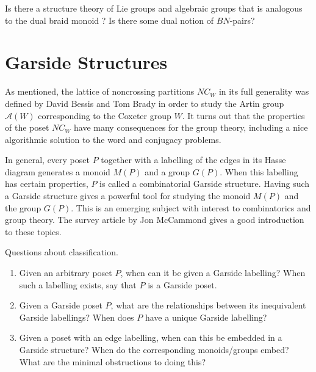 \documentclass[12pt,letterpaper, reqno]{amsart}
\newcommand{\A}{\mathcal A}
\begin{document}
\begin{problem}
Is there a structure theory of Lie groups and algebraic groups that is analogous to the dual braid monoid \cite{bessis:dual}? Is there some dual notion of $BN$-pairs?
\end{problem}

\section{Garside Structures}
As mentioned, the lattice of noncrossing partitions $NC_W$ in its full generality was defined by David Bessis \cite{bessis:dual} and Tom Brady \cite{brady} in order to study the Artin group $\A(W)$ corresponding to the Coxeter group $W$. It turns out that the properties of the poset $NC_W$ have many consequences for the group theory, including a nice algorithmic solution to the word and conjugacy problems.

In general, every poset $P$ together with a labelling of the edges in its Hasse diagram generates a monoid $M(P)$ and a group $G(P)$. When this labelling has certain properties, $P$ is called a {\sf combinatorial Garside structure}. Having such a Garside structure gives a powerful tool for studying the monoid $M(P)$ and the group $G(P)$. This is an emerging subject with interest to combinatorics and group theory. The survey article \cite{mccammond:garside} by Jon McCammond gives a good introduction to these topics.

\begin{problem}  Questions about classification.
\begin{enumerate}
\item Given an arbitrary poset $P$, when can it be given a Garside labelling? When such a labelling exists, say that $P$ is a {\sf Garside poset}.
\item Given a Garside poset $P$, what are the relationships between its inequivalent Garside labellings? When does $P$ have a unique Garside labelling?
\item Given a poset with an edge labelling, when can this be embedded in a Garside structure? When do the corresponding monoids/groups embed? What are the minimal obstructions to doing this?
\end{enumerate}
\end{problem}
\end{document}
